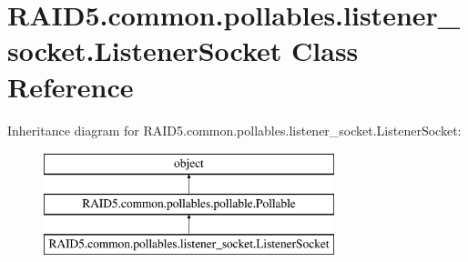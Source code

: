 \hypertarget{class_r_a_i_d5_1_1common_1_1pollables_1_1listener__socket_1_1_listener_socket}{}\section{R\+A\+I\+D5.\+common.\+pollables.\+listener\+\_\+socket.\+Listener\+Socket Class Reference}
\label{class_r_a_i_d5_1_1common_1_1pollables_1_1listener__socket_1_1_listener_socket}
Inheritance diagram for R\+A\+I\+D5.\+common.\+pollables.\+listener\+\_\+socket.\+Listener\+Socket\+:\begin{figure}[H]
\begin{center}
\leavevmode
\includegraphics[height=3.000000cm]{class_r_a_i_d5_1_1common_1_1pollables_1_1listener__socket_1_1_listener_socket}
\end{center}
\end{figure}
